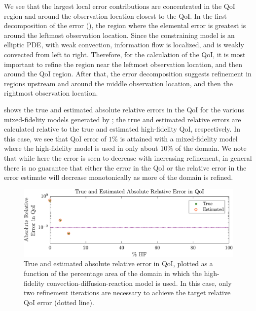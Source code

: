\documentclass[review,sort&compress]{elsarticle}
\begin{document}
We see that the largest local error contributions are concentrated in the QoI region and around the observation location closest to the QoI. In the first decomposition of the error (), the region where the elemental error is greatest is around the leftmost observation location. Since the constraining model is an elliptic PDE, with weak convection, information flow is localized, and is weakly convected from left to right. Therefore, for the calculation of the QoI, it is most important to refine the region near the leftmost observation location, and then around the QoI region. After that, the error decomposition suggests refinement in regions upstream and around the middle observation location, and then the rightmost observation location.

 shows the true and estimated absolute relative errors in the QoI for the various mixed-fidelity models generated by ; the true and estimated relative errors are calculated relative to the true and estimated high-fidelity QoI, respectively. In this case, we see that QoI error of $1\%$ is attained with a mixed-fidelity model where the high-fidelity model is used in only about $10\%$ of the domain. We note that while here the error is seen to decrease with increasing refinement, in general there is no guarantee that either the error in the QoI or the relative error in the error estimate will decrease monotonically as more of the domain is refined.
%
\begin{figure}[htbp]
\centering
\includegraphics[width=\textwidth]{baseSeries/err_est_v2.pdf}
\caption{True and estimated absolute relative error in QoI, plotted as a function of the percentage area of the domain in which the high-fidelity convection-diffusion-reaction model is used. In this case, only two refinement iterations are necessary to achieve the target relative QoI error (dotted line).}
\label{fig:baseErr}
\end{figure}
%
\end{document}
